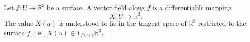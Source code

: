 Let $f: U \to \mathbb{R}^3$ be a surface. A vector field along $f$ is a differentiable mapping
$$X: U \to \mathbb{R}^3.$$
The value $X(u)$ is understood to lie in the tangent space of $\mathbb{R}^3$ restricted to the surface $f$, i.e., $X(u) \in T_{f(u)} \mathbb{R}^3$.
